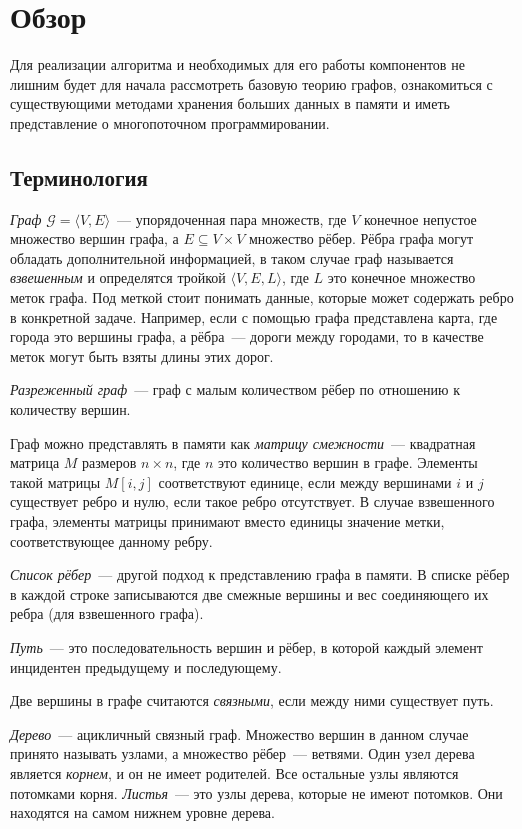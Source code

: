 
\section{Обзор}
\label{sec:relatedworks}
Для реализации алгоритма и необходимых для его работы компонентов не лишним будет для начала рассмотреть базовую теорию графов, ознакомиться с существующими методами хранения больших данных в памяти и иметь представление о многопоточном программировании.

\subsection{Терминология}
\textit{Граф} $\mathcal{G} = \langle V, E \rangle$~--- упорядоченная пара множеств, где $V$ конечное непустое множество вершин графа, а $E \subseteq V \times V$ множество рёбер. Рёбра графа могут обладать дополнительной информацией, в таком случае граф называется \textit{взвешенным} и определятся тройкой $\langle V, E, L \rangle$, где $L$ это конечное множество меток графа. Под меткой стоит понимать данные, которые может содержать ребро в конкретной задаче. Например, если с помощью графа представлена карта, где города это вершины графа, а рёбра~--- дороги между городами, то в качестве меток могут быть взяты длины этих дорог.

\textit{Разреженный граф}~--- граф с малым количеством рёбер по отношению к количеству вершин.

Граф можно представлять в памяти как \textit{матрицу смежности}~--- квадратная матрица $M$ размеров $n \times n$, где $n$ это количество вершин в графе. Элементы такой матрицы $M[i,j]$ соответствуют единице, если между вершинами $i$ и $j$ существует ребро и нулю, если такое ребро отсутствует. В случае взвешенного графа, элементы матрицы принимают вместо единицы значение метки, соответствующее данному ребру.

\textit{Список рёбер}~--- другой подход к представлению графа в памяти. В списке рёбер в каждой строке записываются две смежные вершины и вес соединяющего 
их ребра (для взвешенного графа).

\textit{Путь}~--- это последовательность вершин и рёбер, в которой каждый элемент инцидентен предыдущему и последующему.

Две вершины в графе считаются \textit{связными}, если между ними существует путь.

\textit{Дерево}~---  ацикличный связный граф. Множество вершин в данном случае принято называть узлами, а множество рёбер~--- ветвями. Один узел дерева является \textit{корнем}, и он не имеет родителей. Все остальные узлы являются потомками корня. \textit{Листья}~--- это узлы дерева, которые не имеют потомков. Они находятся на самом нижнем уровне дерева.

